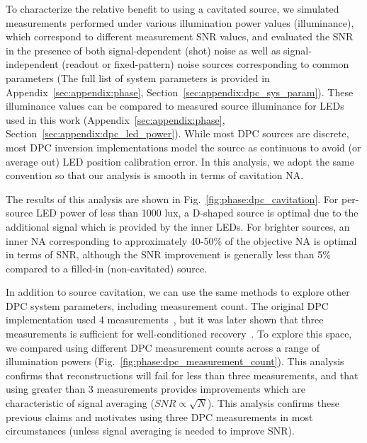 \clearpage
To characterize the relative benefit to using a cavitated source, we simulated measurements performed under various illumination power values (illuminance), which correspond to different measurement SNR values, and evaluated the SNR in the presence of both signal-dependent (shot) noise as well as signal-independent (readout or fixed-pattern) noise sources corresponding to common parameters (The full list of system parameters is provided in Appendix~\ref{sec:appendix:phase}, Section~\ref{sec:appendix:dpc_sys_param}). These illuminance values can be compared to measured source illuminance for LEDs used in this work (Appendix~\ref{sec:appendix:phase}, Section~\ref{sec:appendix:dpc_led_power}). While most DPC sources are discrete, most DPC inversion implementations model the source as continuous to avoid (or average out) LED position calibration error. In this analysis, we adopt the same convention so that our analysis is smooth in terms of cavitation NA.

The results of this analysis are shown in Fig.~\ref{fig:phase:dpc_cavitation}. For per-source LED power of less than 1000 lux, a D-shaped source is optimal due to the additional signal which is provided by the inner LEDs. For brighter sources, an inner NA corresponding to approximately 40-50\% of the objective NA is optimal in terms of SNR, although the SNR improvement is generally less than 5\% compared to a filled-in (non-cavitated) source.

In addition to source cavitation, we can use the same methods to explore other DPC system parameters, including measurement count. The original DPC implementation used 4 measurements~\cite{tian2015quantitative}, but it was later shown that three measurements is sufficient for well-conditioned recovery~\cite{PhillipsChen17cDPC}. To explore this space, we compared using different DPC measurement counts across a range of illumination powers (Fig.~\ref{fig:phase:dpc_measurement_count}). This analysis confirms that reconstructions will fail for less than three measurements, and that using greater than 3 measurements provides improvements which are characteristic of signal averaging ($SNR \propto \sqrt{N}$). This analysis confirms these previous claims and motivates using three DPC measurements in most circumstances (unless signal averaging is needed to improve SNR).

